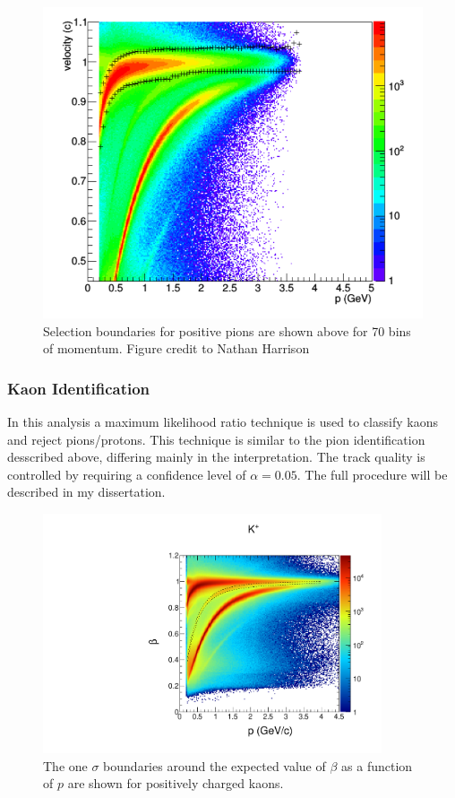 \begin{figure}
  \centering 
  \includegraphics[width=12cm]{image/nathan-pip.png}
  \caption{Selection boundaries for positive pions are shown above for 70 bins of momentum.  Figure credit to Nathan Harrison \cite{theses-harrison:2015}}
\end{figure}

\subsubsection{Kaon Identification}
In this analysis a maximum likelihood ratio technique is used to classify kaons and reject pions/protons.  This technique is similar to the pion identification desscribed above, differing mainly in the interpretation.  The track quality is controlled by requiring a confidence level of $\alpha = 0.05$.  The full procedure will be described in my dissertation. 

\begin{figure}
  \centering 
  \includegraphics[width=10cm]{image/pbeta_kp.pdf}
  \caption{The one $\sigma$ boundaries around the expected value of $\beta$ as a function of $p$ are shown for positively charged kaons.}
\end{figure}

